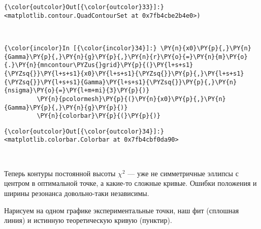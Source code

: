 \begin{Verbatim}[commandchars=\\\{\}]
{\color{outcolor}Out[{\color{outcolor}33}]:} <matplotlib.contour.QuadContourSet at 0x7fb4cbe2b4e0>)
\end{Verbatim}
            
    \begin{center}
    \end{center}
    { \hspace*{\fill} \\}
    
    \begin{Verbatim}[commandchars=\\\{\}]
{\color{incolor}In [{\color{incolor}34}]:} \PY{n}{x0}\PY{p}{,}\PY{n}{Gamma}\PY{p}{,}\PY{n}{g}\PY{p}{,}\PY{n}{r}\PY{o}{=}\PY{n}{m}\PY{o}{.}\PY{n}{mncontour\PYZus{}grid}\PY{p}{(}\PY{l+s+s1}{\PYZsq{}}\PY{l+s+s1}{x0}\PY{l+s+s1}{\PYZsq{}}\PY{p}{,}\PY{l+s+s1}{\PYZsq{}}\PY{l+s+s1}{Gamma}\PY{l+s+s1}{\PYZsq{}}\PY{p}{,}\PY{n}{nsigma}\PY{o}{=}\PY{l+m+mi}{3}\PY{p}{)}
         \PY{n}{pcolormesh}\PY{p}{(}\PY{n}{x0}\PY{p}{,}\PY{n}{Gamma}\PY{p}{,}\PY{n}{g}\PY{p}{)}
         \PY{n}{colorbar}\PY{p}{(}\PY{p}{)}
\end{Verbatim}


\begin{Verbatim}[commandchars=\\\{\}]
{\color{outcolor}Out[{\color{outcolor}34}]:} <matplotlib.colorbar.Colorbar at 0x7fb4cbf0da90>
\end{Verbatim}
            
    \begin{center}
    \end{center}
    { \hspace*{\fill} \\}
    
    Теперь контуры постоянной высоты \(\chi^2\) --- уже не симметричные
эллипсы с центром в оптимальной точке, а какие-то сложные кривые. Ошибки
положения и ширины резонанса довольно-таки независимы.

Нарисуем на одном графике экспериментальные точки, наш фит (сплошная
линия) и истинную теоретическую кривую (пунктир).

